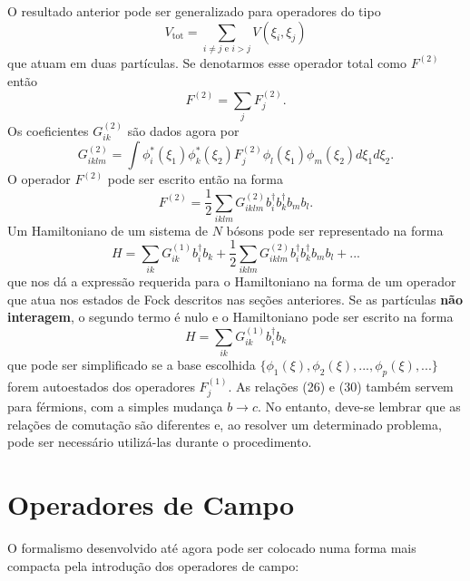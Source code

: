 \documentclass{article}
\begin{document}
O resultado anterior pode ser generalizado para operadores do tipo 
\begin{equation}
    V_{\text{tot}} = \sum_{i\neq j \text{ e } i> j} V(\xi_i,\xi_j)
\end{equation}
que atuam em duas partículas. Se denotarmos esse operador total como $F^{(2)}$ então
\begin{equation}
    F^{(2)} = \sum_j F_j^{(2)}.
\end{equation}
Os coeficientes $G_{ik}^{(2)}$ são dados agora por
\begin{equation}
    G_{iklm}^{(2)} = \int \phi_i^{*}(\xi_1)\phi_k^{*}(\xi_2)F_j^{(2)}\phi_l(\xi_1)\phi_m(\xi_2)d\xi_1 d\xi_2.
\end{equation}
O operador $F^{(2)}$ pode ser escrito então na forma
\begin{equation}
    F^{(2)} = \frac{1}{2}\sum_{iklm} G_{iklm}^{(2)}b_i^\dagger b_k^\dagger b_m b_l.
\end{equation}
Um Hamiltoniano de um sistema de $N$ bósons pode ser representado na forma
\begin{equation}
    H = \sum_{ik}G_{ik}^{(1)}b_i^\dagger b_k + \frac{1}{2}\sum_{iklm} G_{iklm}^{(2)}b_i^\dagger b_k^\dagger b_m b_l + ...
\end{equation}
que nos dá a expressão requerida para o Hamiltoniano na forma de um operador que atua nos estados de Fock descritos nas seções anteriores. Se as partículas \textbf{não interagem}, o segundo termo é nulo e o Hamiltoniano pode ser escrito na forma
\begin{equation}
    H = \sum_{ik}G_{ik}^{(1)}b_i^\dagger b_k
\end{equation}
que pode ser simplificado se a base escolhida $\{ \phi_1(\xi), \phi_2(\xi),...,\phi_p(\xi),... \}$ forem autoestados dos operadores $F_j^{(1)}$. As relações (26) e (30) também servem para férmions, com a simples mudança $b\rightarrow c$. No entanto, deve-se lembrar que as relações de comutação são diferentes e, ao resolver um determinado problema, pode ser necessário utilizá-las durante o procedimento.

\section{Operadores de Campo}

O formalismo desenvolvido até agora pode ser colocado numa forma mais compacta pela introdução dos operadores de campo:
\end{document}

